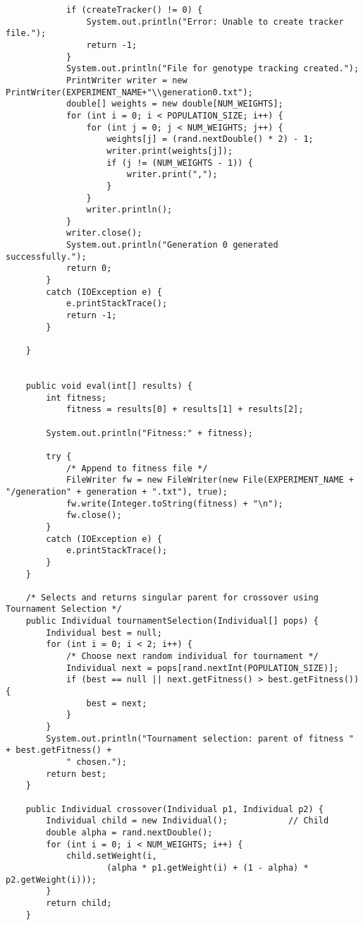 \documentclass[12pt,a4paper]{article}
\begin{document}
\begin{lstlisting}
            if (createTracker() != 0) {
                System.out.println("Error: Unable to create tracker file.");
                return -1;
            }
            System.out.println("File for genotype tracking created.");
            PrintWriter writer = new PrintWriter(EXPERIMENT_NAME+"\\generation0.txt");
            double[] weights = new double[NUM_WEIGHTS];
            for (int i = 0; i < POPULATION_SIZE; i++) {
                for (int j = 0; j < NUM_WEIGHTS; j++) {
                    weights[j] = (rand.nextDouble() * 2) - 1;
                    writer.print(weights[j]);
                    if (j != (NUM_WEIGHTS - 1)) {
                        writer.print(",");
                    }
                }
                writer.println();
            }
            writer.close();
            System.out.println("Generation 0 generated successfully.");
            return 0;
        }
        catch (IOException e) {
            e.printStackTrace();
            return -1;
        }

    }


    public void eval(int[] results) {
        int fitness;
            fitness = results[0] + results[1] + results[2];

        System.out.println("Fitness:" + fitness);

        try {
            /* Append to fitness file */
            FileWriter fw = new FileWriter(new File(EXPERIMENT_NAME + "/generation" + generation + ".txt"), true);
            fw.write(Integer.toString(fitness) + "\n");
            fw.close();
        }
        catch (IOException e) {
            e.printStackTrace();
        }
    }

    /* Selects and returns singular parent for crossover using Tournament Selection */
    public Individual tournamentSelection(Individual[] pops) {
        Individual best = null;
        for (int i = 0; i < 2; i++) {
            /* Choose next random individual for tournament */
            Individual next = pops[rand.nextInt(POPULATION_SIZE)];
            if (best == null || next.getFitness() > best.getFitness()) {
                best = next;
            }
        }
        System.out.println("Tournament selection: parent of fitness " + best.getFitness() +
            " chosen.");
        return best;
    }

    public Individual crossover(Individual p1, Individual p2) {
        Individual child = new Individual();            // Child
        double alpha = rand.nextDouble();
        for (int i = 0; i < NUM_WEIGHTS; i++) {
            child.setWeight(i,
                    (alpha * p1.getWeight(i) + (1 - alpha) * p2.getWeight(i)));
        }
        return child;
    }


\end{lstlisting}
\end{document}
